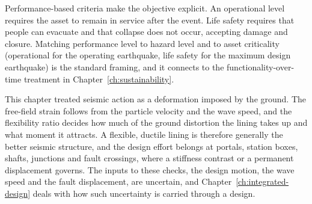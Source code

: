 Performance-based criteria make the objective explicit. An operational level
requires the asset to remain in service after the event. Life safety requires
that people can evacuate and that collapse does not occur, accepting damage
and closure. Matching performance level to hazard level and to asset
criticality (operational for the operating earthquake, life safety
for the maximum design earthquake) is the standard framing, and it connects
to the functionality-over-time treatment in
Chapter~\ref{ch:sustainability}.

This chapter treated seismic action as a deformation imposed by the ground.
The free-field strain follows from the particle velocity and the wave speed,
and the flexibility ratio decides how much of the ground distortion the
lining takes up and what moment it attracts. A flexible, ductile lining is
therefore generally the better seismic structure, and the design effort
belongs at portals, station boxes, shafts, junctions and fault crossings,
where a stiffness contrast or a permanent displacement governs. The inputs
to these checks, the design motion, the wave speed and the fault
displacement, are uncertain, and Chapter~\ref{ch:integrated-design} deals
with how such uncertainty is carried through a design.

\chapterreferences

